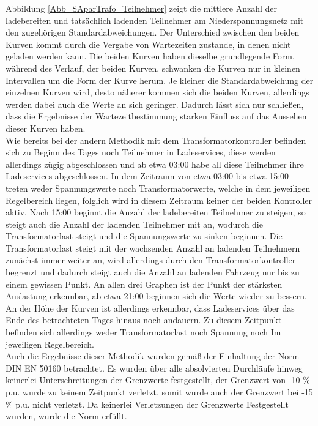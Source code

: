 Abbildung \ref{Abb_SAparTrafo_Teilnehmer} zeigt die mittlere Anzahl der ladebereiten und tatsächlich ladenden Teilnehmer am Niederspannungsnetz mit den zugehörigen Standardabweichungen. Der Unterschied zwischen den beiden Kurven kommt durch die Vergabe von Wartezeiten zustande, in denen nicht geladen werden kann. Die beiden Kurven haben dieselbe grundlegende Form, während des Verlauf, der beiden Kurven, schwanken die Kurven nur in kleinen Intervallen um die Form der Kurve herum. Je kleiner die Standardabweichung der einzelnen Kurven wird, desto näherer kommen sich die beiden Kurven, allerdings werden dabei auch die Werte an sich geringer. Dadurch lässt sich nur schließen, dass die Ergebnisse der Wartezeitbestimmung starken Einfluss auf das Aussehen dieser Kurven haben.\\
Wie bereits bei der andern Methodik mit dem Transformatorkontroller befinden sich zu Beginn des Tages noch Teilnehmer in Ladeservices, diese werden allerdings zügig abgeschlossen und ab etwa 03:00 habe all diese Teilnehmer ihre Ladeservices abgeschlossen. In dem Zeitraum von etwa 03:00 bis etwa 15:00 treten weder Spannungswerte noch Transformatorwerte, welche in dem jeweiligen Regelbereich liegen, folglich wird in diesem Zeitraum keiner der beiden Kontroller aktiv. Nach 15:00 beginnt die Anzahl der ladebereiten Teilnehmer zu steigen, so steigt auch die Anzahl der ladenden Teilnehmer mit an, wodurch die Transformatorlast steigt und die Spannungswerte zu sinken beginnen. Die Transformatorlast steigt mit der wachsenden Anzahl an ladenden Teilnehmern zunächst immer weiter an, wird allerdings durch den Transformatorkontroller begrenzt und dadurch steigt auch die Anzahl an ladenden Fahrzeug nur bis zu einem gewissen Punkt. An allen drei Graphen ist der Punkt der stärksten Auslastung erkennbar, ab etwa 21:00 beginnen sich die Werte wieder zu bessern. An der Höhe der Kurven ist allerdings erkennbar, dass Ladeservices über das Ende des betrachteten Tages hinaus noch andauern. Zu diesem Zeitpunkt befinden sich allerdings weder Transformatorlast noch Spannung noch Im jeweiligen Regelbereich.\\
Auch die Ergebnisse dieser Methodik wurden gemäß der Einhaltung der Norm DIN EN 50160 betrachtet. Es wurden über alle absolvierten Durchläufe hinweg keinerlei Unterschreitungen der Grenzwerte festgestellt, der Grenzwert von -10 \% p.u. wurde zu keinem Zeitpunkt verletzt, somit wurde auch der Grenzwert bei -15 \% p.u. nicht verletzt. Da keinerlei Verletzungen der Grenzwerte Festgestellt wurden, wurde die Norm erfüllt.\\
